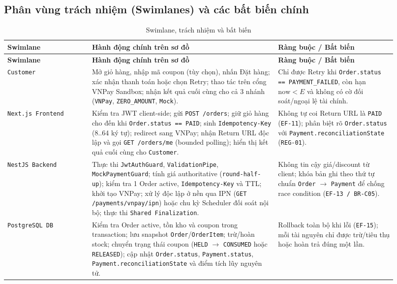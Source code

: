 \subsection{Phân vùng trách nhiệm (Swimlanes) và các bất biến chính}

\begingroup\small
\renewcommand{\arraystretch}{1.2}
\begin{longtable}{>{\raggedright\arraybackslash}p{0.20\linewidth}>{\raggedright\arraybackslash}p{0.44\linewidth}>{\raggedright\arraybackslash}p{0.28\linewidth}}
\caption{Swimlane, trách nhiệm và bất biến}\label{tab:auto-activity-diagram-1}\\
\hline
\textbf{Swimlane} & \textbf{Hành động chính trên sơ đồ} & \textbf{Ràng buộc / Bất biến} \\ \hline
\endfirsthead
\hline
\textbf{Swimlane} & \textbf{Hành động chính trên sơ đồ} & \textbf{Ràng buộc / Bất biến} \\ \hline
\endhead
\texttt{Customer} & Mở giỏ hàng, nhập mã coupon (tùy chọn), nhấn Đặt hàng; xác nhận thanh toán hoặc chọn Retry; thao tác trên cổng VNPay Sandbox; nhận kết quả cuối cùng cho cả 3 nhánh (\texttt{VNPay}, \texttt{ZERO\_AMOUNT}, \texttt{Mock}). & Chỉ được Retry khi \texttt{Order.status == PAYMENT\_FAILED}, còn hạn \(\text{now} < E\) và không có cờ đối soát/ngoại lệ tài chính. \\ \hline
\texttt{Next.js Frontend} & Kiểm tra JWT client-side; gửi \texttt{POST /orders}; giữ giỏ hàng cho đến khi \texttt{Order.status == PAID}; sinh \texttt{Idempotency-Key} (8..64 ký tự); redirect sang VNPay; nhận Return URL độc lập và gọi \texttt{GET /orders/me} (bounded polling); hiển thị kết quả cuối cùng cho \texttt{Customer}. & Không tự coi Return URL là \texttt{PAID} (\texttt{EF-11}); phân biệt rõ \texttt{Order.status} với \texttt{Payment.reconciliationState} (\texttt{REG-01}). \\ \hline
\texttt{NestJS Backend} & Thực thi \texttt{JwtAuthGuard}, \texttt{ValidationPipe}, \texttt{MockPaymentGuard}; tính giá authoritative (\texttt{round-half-up}); kiểm tra 1 Order active, \texttt{Idempotency-Key} và TTL; khởi tạo VNPay; xử lý độc lập ở nền qua IPN (\texttt{GET /payments/vnpay/ipn}) hoặc chu kỳ Scheduler đối soát nội bộ; thực thi \texttt{Shared Finalization}. & Không tin cậy giá/discount từ client; khóa bản ghi theo thứ tự chuẩn \texttt{Order} $\rightarrow$ \texttt{Payment} để chống race condition (\texttt{EF-13 / BR-C05}). \\ \hline
\texttt{PostgreSQL DB} & Kiểm tra Order active, tồn kho và coupon trong transaction; lưu snapshot \texttt{Order}/\texttt{OrderItem}; trừ/hoàn stock; chuyển trạng thái coupon (\texttt{HELD} \(\rightarrow\) \texttt{CONSUMED} hoặc \texttt{RELEASED}); cập nhật \texttt{Order.status}, \texttt{Payment.status}, \texttt{Payment.reconciliationState} và điểm tích lũy nguyên tử. & Rollback toàn bộ khi lỗi (\texttt{EF-15}); mỗi tài nguyên chỉ được trừ/tiêu thụ hoặc hoàn trả đúng một lần. \\ \hline

\end{longtable}
